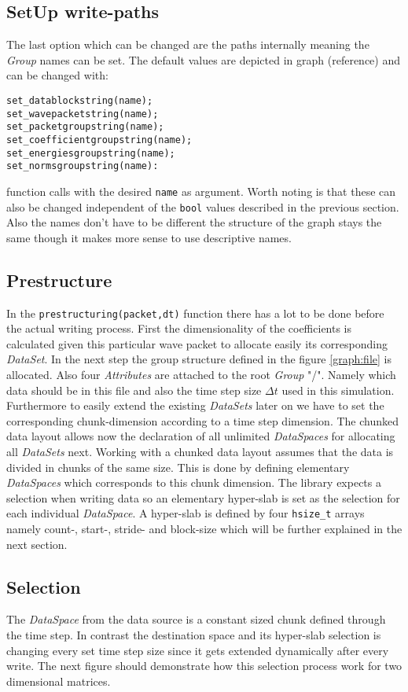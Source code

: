 \documentclass{article}
\begin{document}
\subsection{SetUp write-paths}
The last option which can be changed are the paths internally meaning the \textit{Group} names can be set. The default values are depicted in graph (reference) and can be changed with:
\begin{lstlisting}
set_datablockstring(name);
set_wavepacketstring(name);
set_packetgroupstring(name);
set_coefficientgroupstring(name);
set_energiesgroupstring(name);
set_normsgroupstring(name):
\end{lstlisting}
function calls with the desired \texttt{name} as argument. Worth noting is that these can also be changed independent of the \texttt{bool} values described in the previous section. Also the names don't have to be different the structure of the graph stays the same though it makes more sense to use descriptive names.

\subsection{Prestructure}
In the \texttt{prestructuring(packet,dt)} function there has a lot to be done before the actual writing process. First the dimensionality of the coefficients is calculated given this particular wave packet to allocate easily its corresponding \textit{DataSet}. In the next step the group structure defined in the figure \ref{graph:file} is allocated. Also four \textit{Attributes} are attached to the root \textit{Group} "/". Namely which data should be in this file and also the time step size $\Delta t$ used in this simulation. Furthermore to easily extend the existing \textit{DataSets} later on we have to set the corresponding chunk-dimension according to a time step dimension. The chunked data layout allows now the declaration of all unlimited \textit{DataSpaces} for allocating all \textit{DataSets} next. Working with a chunked data layout assumes that the data is divided in chunks of the same size. This is done by defining elementary \textit{DataSpaces} which corresponds to this chunk dimension. The library expects a selection when writing data so an elementary hyper-slab is set as the selection for each individual \textit{DataSpace}. A hyper-slab is defined by four \texttt{hsize\_t} arrays namely count-, start-, stride- and block-size which will be further explained in the next section. 
\subsection{Selection}
The \textit{DataSpace} from the data source is a constant sized chunk defined through the time step. In contrast the destination space and its hyper-slab selection is changing every set time step size since it gets extended dynamically after every write. The next figure should demonstrate how this selection process work for two dimensional matrices.
\end{document}
